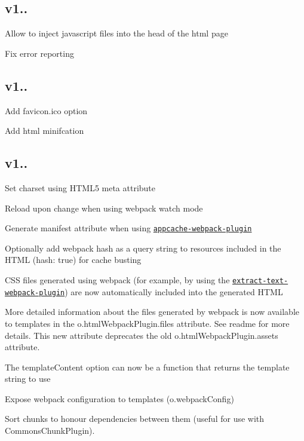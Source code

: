 \subsection*{v1.. }


\begin{DoxyItemize}
\item Allow to inject javascript files into the head of the html page
\item Fix error reporting
\end{DoxyItemize}

\subsection*{v1.. }


\begin{DoxyItemize}
\item Add {\ttfamily favicon.\+ico} option
\item Add html minifcation
\end{DoxyItemize}

\subsection*{v1.. }


\begin{DoxyItemize}
\item Set charset using H\+T\+M\+L5 meta attribute
\item Reload upon change when using webpack watch mode
\item Generate manifest attribute when using \href{https://github.com/lettertwo/appcache-webpack-plugin}{\tt appcache-\/webpack-\/plugin}
\item Optionally add webpack hash as a query string to resources included in the H\+T\+ML ({\ttfamily hash\+: true}) for cache busting
\item C\+SS files generated using webpack (for example, by using the \href{https://github.com/webpack/extract-text-webpack-plugin}{\tt extract-\/text-\/webpack-\/plugin}) are now automatically included into the generated H\+T\+ML
\item More detailed information about the files generated by webpack is now available to templates in the {\ttfamily o.\+html\+Webpack\+Plugin.\+files} attribute. See readme for more details. This new attribute deprecates the old {\ttfamily o.\+html\+Webpack\+Plugin.\+assets} attribute.
\item The {\ttfamily template\+Content} option can now be a function that returns the template string to use
\item Expose webpack configuration to templates ({\ttfamily o.\+webpack\+Config})
\item Sort chunks to honour dependencies between them (useful for use with Commons\+Chunk\+Plugin). 
\end{DoxyItemize}